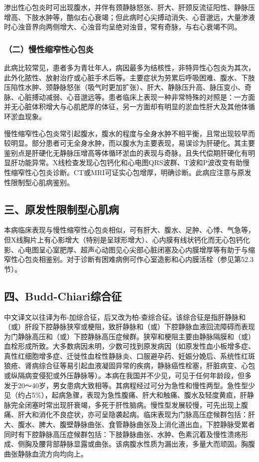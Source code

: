 渗出性心包炎时可出现腹水，并伴有颈静脉怒张、肝大、肝颈反流征阳性、静脉压增高、下肢水肿等，酷似右心衰竭；但此病时心尖搏动消失、心音邈远，大量渗液时心浊音界向两侧增大、心浊音均呈绝对浊音，常有奇脉，与右心衰竭不同。

\subsubsection{（二）慢性缩窄性心包炎}

此病比较常见，患者多为青壮年人，病因最多为结核性，非特异性心包炎为其次，此外化脓性、放射治疗或心脏手术后等。主要症状为劳累后呼吸困难、腹水、下肢压陷性水肿、颈静脉怒张（吸气时更加扩张）、肝大、静脉压升高、脉压变小、奇脉、心脏搏动减弱、心音邈远等。患者临床上表现一种非常特殊的对照是：一方面并无心脏体积增大与心肌肥厚的体征，另一方面却有明显的淤血性肝大及其他体循环淤血现象。

慢性缩窄性心包炎常引起腹水，腹水的程度与全身水肿不相平衡，且常出现较早而较明显。部分患者可无全身水肿，而以腹水为主要表现，易误诊为肝硬化。其主要鉴别点是肝硬化无静脉压增高等体循环淤血的表现与奇脉，且失代偿期肝硬化有明显肝功能异常。X线检查发现心包钙化和心电图QRS波群、T波和P波改变有助慢性缩窄性心包炎诊断。CT或MRI可证实心包增厚，明确诊断。此病应注意与原发性限制型心肌病鉴别。

\subsection{三、原发性限制型心肌病}

本病临床表现与慢性缩窄性心包炎相似，可有肝大、腹水、足肿、心悸、气急等，但X线胸片上有心影增大（特别是呈球形增大）、心内膜有线状钙化而无心包钙化影、心电图呈心室肥厚、超声心动图见心尖部心脏闭塞及心内膜增厚等有助于与缩窄性心包炎相鉴别。对于诊断有困难病例可作心室造影和心内膜活栓（参见第52.3节）。

\subsection{四、Budd-Chiari综合征}

中文译文以往译为布-加综合征，后又改为柏-查综合征。该综合征是指肝静脉和（或）肝段下腔静脉狭窄或梗阻，致肝静脉和（或）下腔静脉血液回流障碍而表现为门静脉高压和（或）下腔静脉高压症候群。狭窄和梗阻主要由静脉隔膜和（或）血栓形成所致。大多数病因未明，少数可找到原发病因（如原发性血小板增多症、真性红细胞增多症、迁徙性血栓性静脉炎、口服避孕药、妊娠分娩后、系统性红斑狼疮、肾病综合征等易引起血液凝固异常的疾病，静脉癌性栓塞，肝脏病变、心包或纵隔病变侵犯或外压静脉等）。本病在我国并不少见，可见于任何年龄段，但多发于20～40岁，男女患病大致相等。其病程经过可分为急性和慢性两型。急性型少见（约占5\%），起病急骤，表现为急性腹痛、肝大和触痛、腹水及轻度黄疸，肝静脉完全闭塞时常出现肝衰竭，多死于肝性脑病。慢性型发展较慢，可先出现上腹痛、肝大和消化不良症状，亦可呈隐袭起病。临床表现为门脉高压症候群包括：肝大、腹水、脾大、腹壁静脉曲张、食管静脉曲张及上消化道出血，下腔静脉受累者同时有下腔静脉高压症候群包括：下肢静脉曲张、水肿、色素沉着及慢性溃疡形成、侧胸及腰背部静脉显露或曲张。该病腹水性质为漏出液，多量大而顽固。胸腹曲张静脉血流方向均向上。

